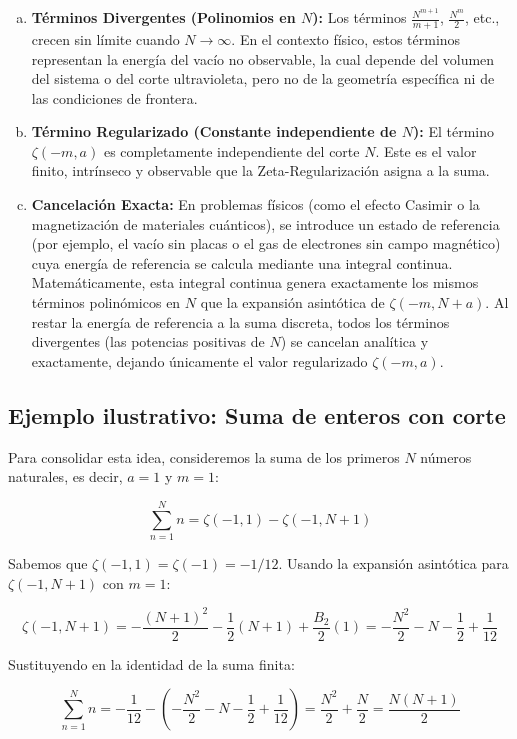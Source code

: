\begin{enumerate}[a)]
    \item \textbf{Términos Divergentes (Polinomios en $N$):} Los términos $\frac{N^{m+1}}{m+1}$, $\frac{N^m}{2}$, etc., crecen sin límite cuando $N \to \infty$. En el contexto físico, estos términos representan la energía del vacío no observable, la cual depende del volumen del sistema o del corte ultravioleta, pero no de la geometría específica ni de las condiciones de frontera.
    \item \textbf{Término Regularizado (Constante independiente de $N$):} El término $\zeta(-m, a)$ es completamente independiente del corte $N$. Este es el valor finito, intrínseco y observable que la Zeta-Regularización asigna a la suma.
    \item \textbf{Cancelación Exacta:} En problemas físicos (como el efecto Casimir o la magnetización de materiales cuánticos), se introduce un estado de referencia (por ejemplo, el vacío sin placas o el gas de electrones sin campo magnético) cuya energía de referencia se calcula mediante una integral continua. Matemáticamente, esta integral continua genera exactamente los mismos términos polinómicos en $N$ que la expansión asintótica de $\zeta(-m, N+a)$. Al restar la energía de referencia a la suma discreta, todos los términos divergentes (las potencias positivas de $N$) se cancelan analítica y exactamente, dejando únicamente el valor regularizado $\zeta(-m, a)$.
\end{enumerate}

\subsection{Ejemplo ilustrativo: Suma de enteros con corte}

Para consolidar esta idea, consideremos la suma de los primeros $N$ números naturales, es decir, $a=1$ y $m=1$:

$$ \sum_{n=1}^{N} n = \zeta(-1, 1) - \zeta(-1, N+1) $$

Sabemos que $\zeta(-1, 1) = \zeta(-1) = -1/12$. Usando la expansión asintótica para $\zeta(-1, N+1)$ con $m=1$:

$$ \zeta(-1, N+1) = -\frac{(N+1)^2}{2} - \frac{1}{2}(N+1) + \frac{B_2}{2}(1) = -\frac{N^2}{2} - N - \frac{1}{2} + \frac{1}{12} $$

Sustituyendo en la identidad de la suma finita:

$$ \sum_{n=1}^{N} n = -\frac{1}{12} - \left( -\frac{N^2}{2} - N - \frac{1}{2} + \frac{1}{12} \right) = \frac{N^2}{2} + \frac{N}{2} = \frac{N(N+1)}{2} $$

